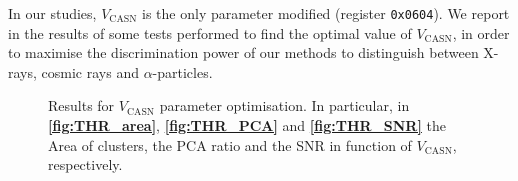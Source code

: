 \documentclass[../../main/main.tex]{subfiles}
\begin{document}
In our studies, $V_{\mathrm{CASN}}$ is the only parameter modified (register \texttt{0x0604}). We report in  the results of some tests performed to find the optimal value of $V_{\mathrm{CASN}}$, in order to maximise the discrimination power of our methods to distinguish between X-rays, cosmic rays and $\alpha$-particles.


\begin{figure}[h]
    \begin{minipage}[c]{0.33\linewidth}
        \vspace{0pt}
        \centering
    \end{minipage}%
    \hfill%
    \begin{minipage}[c]{0.33\linewidth}
        \vspace{0pt}
        \centering
    \end{minipage}%
    \hfill%
    \begin{minipage}[c]{0.33\linewidth}
        \vspace{0pt}
        \centering
    \end{minipage}
    \caption{Results for \( V_{\mathrm{CASN}} \) parameter optimisation. In particular, in \textbf{\ref{fig:THR_area}}, \textbf{\ref{fig:THR_PCA}} and \textbf{\ref{fig:THR_SNR}} the Area of clusters, the PCA ratio and the SNR in function of \( V_{\mathrm{CASN}} \), respectively.}
    \label{fig:THR_graph}
\end{figure}
\end{document}
